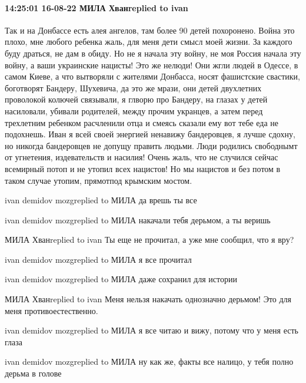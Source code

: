  
 
 
 
 

\paragraph{14:25:01 16-08-22 МИЛА Хванreplied to ivan}

Так и на Донбассе есть алея ангелов, там более 90 детей похоронено. Война это
плохо, мне любого ребенка жаль, для меня дети смысл моей жизни. За каждого буду
драться, не дам в обиду. Но не я начала эту войну, не моя Россия начала эту
войну, а ваши украинские нацисты! Это же нелюди! Они жгли людей в Одессе, в
самом Киеве, а что вытворяли с жителями Донбасса, носят фашистские свастики,
боготворят Бандеру, Шухевича, да это же мрази, они детей двухлетних проволокой
колючей связывали, я глворю про Бандеру, на глазах у детей насиловали, убивали
родителей, между прочим укранцев, а затем перед трехлетним ребенком расчленили
отца и смеясь сказали ему вот тебе еда не подохнешь. Иван я всей своей энергией
ненавижу бандеровцев, я лучше сдохну, но никогда бандеровцев не допущу править
людьми. Люди родились свободнымт от угнетения, издевательств и насилия! Очень
жаль, что не случился сейчас всемирный потоп и не утопил всех нацистов! Но мы
нацистов и без потом в таком случае утопим, прямотпод крымским мостом.

ivan demidov mozgreplied to МИЛА
да врешь ты все

ivan demidov mozgreplied to МИЛА
накачали тебя дерьмом, а ты веришь

МИЛА Хванreplied to ivan
Ты еще не прочитал, а уже мне сообщил, что я вру?

ivan demidov mozgreplied to МИЛА
я все прочитал

ivan demidov mozgreplied to МИЛА
даже сохранил для истории

МИЛА Хванreplied to ivan
Меня нельзя накачать однозначно дерьмом! Это для меня противоестественно.

ivan demidov mozgreplied to МИЛА
я все читаю и вижу, потому что у меня есть глаза

ivan demidov mozgreplied to МИЛА
ну как же, факты все налицо, у тебя полно дерьма в голове

